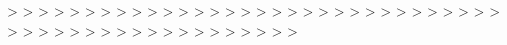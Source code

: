 \documentclass{article}%
\begin{document}
>\newline%
>\newline%
>\newline%
>\newline%
>\newline%
>\newline%
>\newline%
>\newline%
>\newline%
>\newline%
>\newline%
>\newline%
>\newline%
>\newline%
>\newline%
>\newline%
>\newline%
>\newline%
>\newline%
>\newline%
>\newline%
>\newline%
>\newline%
>\newline%
>\newline%
>\newline%
>\newline%
>\newline%
>\newline%
>\newline%
>\newline%
>\newline%
>\newline%
>\newline%
>\newline%
>\newline%
>\newline%
>\newline%
>\newline%
>\newline%
>\newline%
>\newline%
>\newline%
>\newline%
>\newline%
>\newline%
>\newline%
>\newline%
>\newline%
>\newline%
>\newline%
\end{document}
